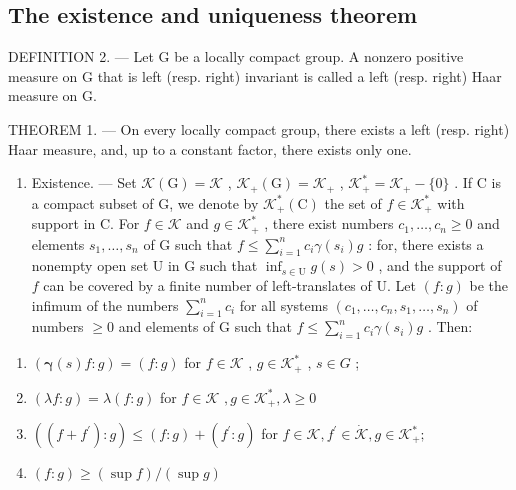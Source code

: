 \subsection{The existence and uniqueness theorem}

DEFINITION 2. --- Let G be a locally compact group. A nonzero positive measure on G that is left (resp. right) invariant is called a left (resp. right) Haar measure on G.

THEOREM 1. --- On every locally compact group, there exists a left (resp. right) Haar measure, and, up to a constant factor, there exists only one.

\begin{enumerate}
\def\labelenumi{\Alph{enumi})}
\tightlist
\item
  Existence. --- Set \(\mathcal{K}(\mathrm{G}) = \mathcal{K}\) , \(\mathcal{K}_{+}(\mathrm{G}) = \mathcal{K}_{+}\) , \(\mathcal{K}_{+}^{*} = \mathcal{K}_{+} - \{0\}\) . If C is a compact subset of G, we denote by \(\mathcal{K}_{+}^{*}(\mathrm{C})\) the set of \(f \in \mathcal{K}_{+}^{*}\) with support in C. For \(f \in \mathcal{K}\) and \(g \in \mathcal{K}_{+}^{*}\) , there exist numbers \(c_{1}, \ldots, c_{n} \geqslant 0\) and elements \(s_{1}, \ldots, s_{n}\) of G such that \(f \leqslant \sum_{i=1}^{n} c_{i} \gamma(s_{i}) g\) : for, there exists a nonempty open set U in G such that \(\inf_{s \in \mathrm{U}} g(s) > 0\) , and the support of \(f\) can be covered by a finite number of left-translates of U. Let \((f : g)\) be the infimum of the numbers \(\sum_{i=1}^{n} c_{i}\) for all systems \((c_{1}, \ldots, c_{n}, s_{1}, \ldots, s_{n})\) of numbers \(\geqslant 0\) and elements of G such that \(f \leqslant \sum_{i=1}^{n} c_{i} \gamma(s_{i}) g\) . Then:
\end{enumerate}

\begin{enumerate}
\def\labelenumi{(\roman{enumi})}
\item
  \(\left(\pmb{\gamma}(s)f:g\right) = (f:g)\) for \(f\in \mathcal{K}\) , \(g\in \mathcal{K}_{+}^{*}\) , \(s\in G\) ;
\item
  \((\lambda f:g) = \lambda (f:g)\) for \(f\in \mathcal{K}\) \(,g\in \mathcal{K}_{+}^{*},\lambda \geqslant 0\)
\item
  \(\left((f + f^{\prime}):g\right)\leqslant (f:g) + (f^{\prime}:g)\) for \(f\in \mathcal{K},f^{\prime}\in \dot{\mathcal{K}},g\in \mathcal{K}_{+}^{*};\)
\item
  \((f:g)\geqslant (\sup f) / (\sup g)\)
\end{enumerate}

